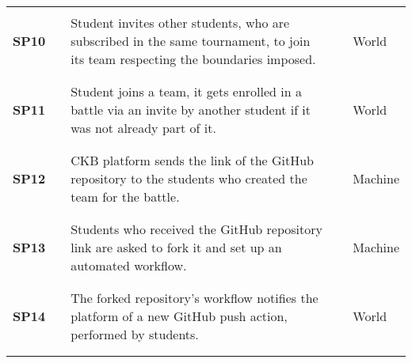 \begin{longtable}[H]{l l p{8.5cm} l l}
                  &        &                                                                                                                                &        &                        \\\hline & & \\
    \textbf{SP10} & \vline & Student invites other students, who are subscribed in the same tournament, to join its team respecting the boundaries imposed. & \vline & World                  \\
                  &        &                                                                                                                                &        &                        \\\hline & & \\
    \textbf{SP11} & \vline & Student joins a team, it gets enrolled in a battle via an invite by another student if it was not already part of it.          & \vline & World                  \\
                  &        &                                                                                                                                &        &                        \\\hline & & \\
    \textbf{SP12} & \vline & CKB platform sends the link of the GitHub repository to the students who created the team for the battle.                      & \vline & Machine                \\
                  &        &                                                                                                                                &        &                        \\\hline & & \\
    \textbf{SP13} & \vline & Students who received the GitHub repository link are asked to fork it and set up an automated workflow.                        & \vline & Machine                \\
                  &        &                                                                                                                                &        &                        \\\hline & & \\
    \textbf{SP14} & \vline & The forked repository's workflow notifies the platform of a new GitHub push action, performed by students.                     & \vline & World                  \\
                  &        &                                                                                                                                &        &                        \\\hline & & \\

\end{longtable}
